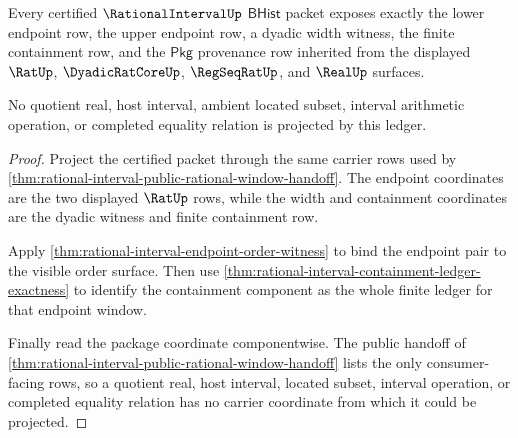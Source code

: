 \begin{theorem}
\label{thm:rationalinterval-endpoint-width-ledger}
Every certified $\RationalIntervalUp$ $\mathsf{BHist}$ packet exposes exactly
the lower endpoint row, the upper endpoint row, a dyadic width witness, the
finite containment row, and the $\mathsf{Pkg}$ provenance row inherited from
the displayed $\RatUp$, $\DyadicRatCoreUp$, $\RegSeqRatUp$, and $\RealUp$
surfaces.

No quotient real, host interval, ambient located subset, interval arithmetic
operation, or completed equality relation is projected by this ledger.
\end{theorem}
\begin{proof}
Project the certified packet through the same carrier rows used by
\autoref{thm:rational-interval-public-rational-window-handoff}. The endpoint
coordinates are the two displayed $\RatUp$ rows, while the width and
containment coordinates are the dyadic witness and finite containment row.

Apply \autoref{thm:rational-interval-endpoint-order-witness} to bind the
endpoint pair to the visible order surface. Then use
\autoref{thm:rational-interval-containment-ledger-exactness} to identify the
containment component as the whole finite ledger for that endpoint window.

Finally read the package coordinate componentwise. The public handoff of
\autoref{thm:rational-interval-public-rational-window-handoff} lists the only
consumer-facing rows, so a quotient real, host interval, located subset,
interval operation, or completed equality relation has no carrier coordinate
from which it could be projected.
\end{proof}

